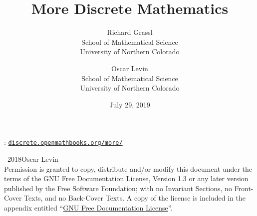 \documentclass[10pt,]{book}
\title{More Discrete Mathematics}
\author{Richard Grassl\\
School of Mathematical Science\\
University of Northern Colorado
\and
Oscar Levin\\
School of Mathematical Science\\
University of Northern Colorado
}
\date{July 29, 2019}
\newcommand{\mono}[1]{\texttt{#1}}
\theoremstyle{plain}
\theoremstyle{definition}
\theoremstyle{definition}
\theoremstyle{definition}
\numberwithin{equation}{chapter}
\begin{document}
\frontmatter

\thispagestyle{empty}
\hypertarget{colophon-1}{}
: \href{http://discrete.openmathbooks.org/more/}{\mono{discrete.openmathbooks.org/more/}}\par\medskip
\noindent\textcopyright\ 2018\quad{}Oscar Levin\\[0.5\baselineskip]
Permission is granted to copy, distribute and/or modify this document under the terms of the GNU Free Documentation License, Version 1.3 or any later version published by the Free Software Foundation; with no Invariant Sections, no Front-Cover Texts, and no Back-Cover Texts.  A copy of the license is included in the appendix entitled ``\hyperref[appendix-gfdl]{GNU Free Documentation License}''.\par\medskip
{}
\null\clearpage
\end{document}
